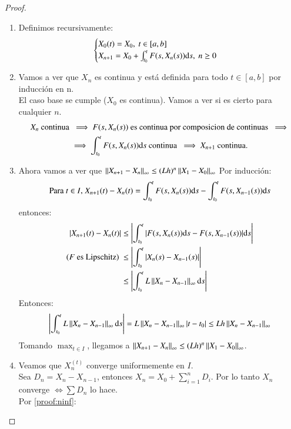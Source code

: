 \begin{proof}
\begin{enumerate}
        \begin{enumerate}
        \item Definimos recursivamente:
            $$
                \begin{cases}
                    X_0(t) = X_0,\ t\in[a, b]\\
                    X_{n+1} = X_0 + \int_{t_0}^t F(s, X_n(s)) \mathrm{d} s,\ n \geq 0
                \end{cases}
            $$
        \item Vamos a ver que $X_n$ es continua y está definida para todo $t \in [a, b]$ por inducción en n.\\
            El caso base se cumple ($X_0$ es continua). Vamos a ver si es cierto para cualquier $n$.
            \begin{gather*}
                X_n \text{ continua } \implies F(s, X_n(s)) \text{ es continua por composicion de continuas } \implies \\
                \implies \int_{t_0}^t F(s, X_n(s)) \mathrm{d} s \text{ continua } \implies X_{n+1} \text{ continua.}
            \end{gather*}
        \item \label{proof:ninf}Ahora vamos a ver que $\left|\left|X_{n+1} - X_n\right|\right|_\infty \leq (Lh)^n \left|\left|X_1 - X_0\right|\right|_\infty$ Por inducción:
        $$
            \text{Para $t \in I$, }
            X_{n+1}(t) - X_n(t) = \int_{t_0}^t F(s, X_{n}(s)) \mathrm{d} s - \int_{t_0}^t F(s, X_{n-1}(s)) \mathrm{d} s
        $$
        entonces:
        \begin{align*}
            |X_{n+1}(t) - X_n(t)| &\leq \left|\int_{t_0}^t |F(s, X_{n}(s)) \mathrm{d} s - F(s, X_{n-1}(s))| \mathrm{d} s\right|\\
            \text{($F$ es Lipschitz) }&\leq \left| \int_{t_0}^t |X_n(s) - X_{n-1}(s)| \right|\\
            &\leq \left| \int_{t_0}^t L \left|\left|X_n - X_{n-1}\right|\right|_\infty \mathrm{d} s \right|
        \end{align*}
        Entonces:
        $$
            \left| \int_{t_0}^t L \left|\left|X_n - X_{n-1}\right|\right|_\infty \mathrm{d} s \right| = L \left|\left|X_n - X_{n-1}\right|\right|_\infty |t-t_0| \leq Lh \left|\left|X_n - X_{n-1}\right|\right|_\infty
        $$
        Tomando $\max_{t\in I}$, llegamos a $\left|\left|X_{n+1} - X_n\right|\right|_\infty \leq (Lh)^n \left|\left|X_1 - X_0\right|\right|_\infty$.
        \item Veamos que $X_n^(t)$ converge uniformemente en $I$.\\
        Sea $D_n = X_n - X_{n-1}$, entonces $X_n = X_0 + \sum_{i=1}^n D_i$. Por lo tanto $X_n$ converge $\iff \sum D_n$ lo hace.\\
        Por \ref{proof:ninf}:

\end{enumerate}
\end{enumerate}
\end{proof}
